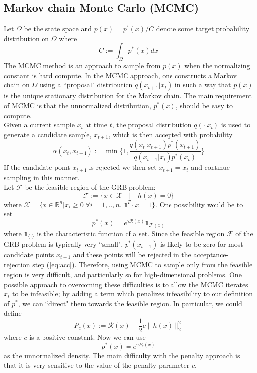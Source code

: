 {\subsection{Markov chain Monte Carlo (MCMC)}
Let $\Omega$ be the state space and $p(x) = p^*(x)/C$ denote some target probability distribution on $\Omega$ where 
\begin{equation}
C := \int_{\Omega} p^*(x) dx
\end{equation}
The MCMC method is an approach to sample from $p(x)$ when the normalizing constant is hard compute. In the MCMC approach, one
constructs a Markov chain on $\Omega$ using a \textquotedblleft proposal" distribution $q(x_{t+1}|x_t)$ in such a way that $p(x)$
is the unique stationary distribution for the Markov chain. The main requirement of MCMC is that the unnormalized distribution, $p^*(x)$, should be easy to compute. \\
Given a current sample $x_t$ at time $t$, the proposal distribution $q(\cdot | x_t)$ is used to generate
a candidate sample, $x_{t+1}$, which is then accepted with probability
\begin{equation}\label{eq:acc}
\alpha(x_t, x_{t+1}) := \min \Big\{ 1, \frac{q(x_t|x_{t+1})p^*(x_{t+1})}{q(x_{t+1}|x_t)p^*(x_t)}\Big\}
\end{equation}
If the candidate point $x_{t+1}$ is rejected we then set $x_{t+1} = x_t$ and continue sampling in this manner.\\
Let $\mathcal{F}$ be the feasible region of the GRB problem:
\begin{equation}
\mathcal{F} := \{ x \in \mathcal{X}\quad|\quad h(x) = 0\}
\end{equation}
where $\mathcal{X} = \{x \in \mathbb{R}^n | x_i \geq 0$ $\forall i=1,..,n$, $\mathds{1}^T\cdot x = 1\}$. One possibility would be to set
\begin{equation}
p^*(x) = e^{\gamma \mathcal{R}(x)}\mathds{1}_{\mathcal{F}(x)} 
\end{equation}
where $\mathds{1}_{\{\cdot\}}$ is the characteristic function of a set. Since the feasible region $\mathcal{F}$ of the GRB problem is typically very \textquotedblleft small", $p^*(x_{t+1})$ is likely to be zero for most candidate points $x_{t+1}$ and these points will be rejected in the acceptance-rejection step (\ref{eq:acc}). Therefore, using MCMC to sample only from the feasible region is very difficult, and particularly so for high-dimensional problems. One possible approach to overcoming these difficulties is to allow the MCMC iterates $x_t$ to be infeasible; by adding a term which penalizes infeasibility to our definition of $p^*$, we can \textquotedblleft direct" them towards the feasible region. In particular, we could define
\begin{equation}
P_c(x) := \mathcal{R}(x) - \frac{1}{2} c \parallel h(x) \parallel^2_2
\end{equation}
where $c$ is a positive constant. Now we can use
\begin{equation}
p^*(x) = e^{\gamma P_c(x)}
\end{equation}
as the unnormalized density. The main difficulty with the penalty approach is that it is very sensitive to the value of the penalty parameter $c$.

}
